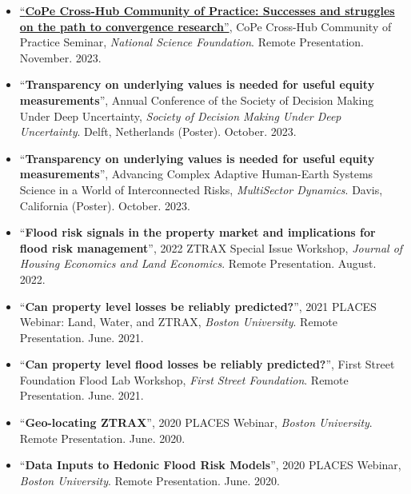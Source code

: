 \documentclass[10pt,oneside]{article}
\begin{document}
\begin{itemize}[label={}]
  
  \item \href{https://zenodo.org/doi/10.5281/zenodo.10137316}{\enquote{\textbf{CoPe Cross-Hub Community of Practice: Successes and struggles on the path to convergence research}}}, CoPe Cross-Hub Community of Practice Seminar,  \textit{National Science Foundation}. Remote Presentation.  November. 2023.
        
  \item \enquote{\textbf{Transparency on underlying values is needed for useful equity measurements}}, Annual Conference of the Society of Decision Making Under Deep Uncertainty,  \textit{Society of Decision Making Under Deep Uncertainty}. Delft, Netherlands (Poster).  October. 2023.
        
  \item \enquote{\textbf{Transparency on underlying values is needed for useful equity measurements}}, Advancing Complex Adaptive Human-Earth Systems Science in a World of Interconnected Risks,  \textit{MultiSector Dynamics}. Davis, California (Poster).  October. 2023.
        
  \item \enquote{\textbf{Flood risk signals in the property market and implications for flood risk management}}, 2022 ZTRAX Special Issue Workshop,  \textit{Journal of Housing Economics and Land Economics}. Remote Presentation.  August. 2022.
        
  \item \enquote{\textbf{Can property level losses be reliably predicted?}}, 2021 PLACES Webinar: Land, Water, and ZTRAX,  \textit{Boston University}. Remote Presentation.  June. 2021.
        
  \item \enquote{\textbf{Can property level flood losses be reliably predicted?}}, First Street Foundation Flood Lab Workshop,  \textit{First Street Foundation}. Remote Presentation.  June. 2021.
        
  \item \enquote{\textbf{Geo-locating ZTRAX}}, 2020 PLACES Webinar,  \textit{Boston University}. Remote Presentation.  June. 2020.
        
  \item \enquote{\textbf{Data Inputs to Hedonic Flood Risk Models}}, 2020 PLACES Webinar,  \textit{Boston University}. Remote Presentation.  June. 2020.
        
\end{itemize}
\end{document}
